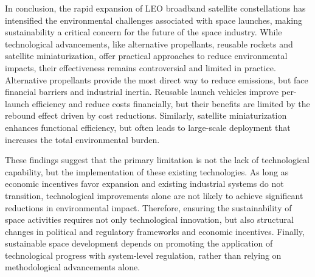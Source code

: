 \documentclass[12pt]{article}
\begin{document}
In conclusion, the rapid expansion of LEO broadband satellite constellations has intensified the environmental challenges associated with space launches, making sustainability a critical concern for the future of the space industry. While technological advancements, like alternative propellants, reusable rockets and satellite miniaturization, offer practical approaches to reduce environmental impacts, their effectiveness remains controversial and limited in practice. Alternative propellants provide the most direct way to reduce emissions, but face financial barriers and industrial inertia. Reusable launch vehicles improve per-launch efficiency and reduce costs financially, but their benefits are limited by the rebound effect driven by cost reductions. Similarly, satellite miniaturization enhances functional efficiency, but often leads to large-scale deployment that increases the total environmental burden.



These findings suggest that the primary limitation is not the lack of technological capability, but the implementation of these existing technologies. As long as economic incentives favor expansion and existing industrial systems do not transition, technological improvements alone are not likely to achieve significant reductions in environmental impact. Therefore, ensuring the sustainability of space activities requires not only technological innovation, but also structural changes in political and regulatory frameworks and economic incentives. Finally, sustainable space development depends on promoting the application of technological progress with system-level regulation, rather than relying on methodological advancements alone.





\newpage


\end{document}
